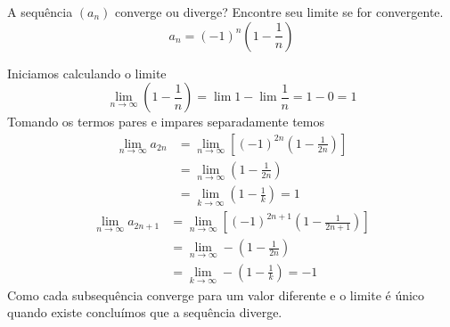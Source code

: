 \begin{exercises}
\begin{exercise}
A sequência $(a_n)$ converge ou diverge? Encontre seu limite se for convergente.
\[
  a_n = (-1)^n \left( 1 - \frac{1}{n} \right)
\]
\begin{answer}
Iniciamos calculando o limite
\[
  \lim_{n\to\infty} \left( 1 - \frac{1}{n} \right) = \lim  1 - \lim \frac{1}{n} = 1 - 0 = 1
\]
Tomando os termos pares e impares separadamente temos
\begin{align*}
	\lim_{n\to\infty} a_{2n} & = \lim_{n\to\infty} \left[(-1)^{2n}   \left( 1 - \frac{1}{2n}   \right)\right] \\
	                         & = \lim_{n\to\infty} \left( 1 - \frac{1}{2n} \right)                            \\
	                         & = \lim_{k\to\infty} \left( 1 - \frac{1}{k} \right) = 1
\end{align*}
\begin{align*}
	\lim_{n\to\infty} a_{2n+1} & = \lim_{n\to\infty} \left[(-1)^{2n+1}   \left( 1 - \frac{1}{2n+1}   \right)\right] \\
	                           & = \lim_{n\to\infty} -\left( 1 - \frac{1}{2n} \right)                               \\
	                           & = \lim_{k\to\infty} -\left( 1 - \frac{1}{k} \right) = -1
\end{align*}
Como cada subsequência converge para um valor diferente e o limite é único quando existe concluímos
que a sequência diverge.
\end{answer}
\end{exercise}


\end{exercises}
